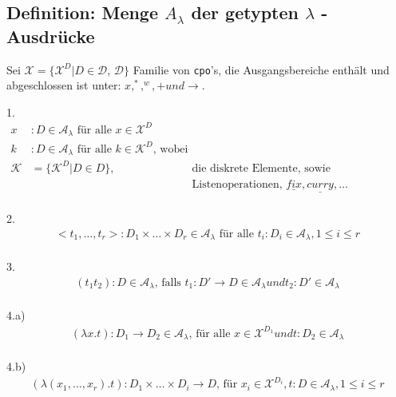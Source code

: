 \subsection{Definition: Menge $A_{\lambda}$ der getypten $\lambda$ -Ausdrücke}
Sei $\mathcal{X} = \{ \mathcal{X}^D | D \in \mathcal{D}$, $\mathcal{D} \}$ Familie von \lstinline!cpo!'s, die Ausgangsbereiche enthält und abgeschlossen ist unter: $x, ^* , ^w , + und \rightarrow$.
\begin{compactitem}
\item[1.] \begin{align*}
x &: D \in \mathcal{A}_\lambda \text{ für alle } x \in \mathcal{X}^D \tag{Atome, Variable}\\
k &: D \in \mathcal{A}_\lambda \text{ für alle } k \in \mathcal{K}^D \text{, wobei } \\ 
\mathcal{K} &= \{ \mathcal{K}^D | D \in D \}, &\text{die diskrete Elemente, sowie Projektionsfunktion,} \\
&& \text{Listenoperationen, } \underline{fix}, \underline{curry}, \dots \\
\end{align*}
\item[2.] \begin{align*}
<t_1, \dots , t_r> : D_1 \times \dots \times D_r \in \mathcal{A}_\lambda \text{ für alle } t_i : D_i \in \mathcal{A}_\lambda, 1 \leq i \leq r \tag{Tupel}\\
\end{align*}
\item[3.] \begin{align*}
(t_1 t_2) : D \in \mathcal{A}_\lambda \text{, falls } t_1 : D' \rightarrow D \in \mathcal{A}_\lambda und t_2 : D' \in \mathcal{A}_\lambda \tag{Applilation} \\
\end{align*}
\item[4.a)] \begin{align*}
(\lambda x.t) : D_1 \rightarrow D_2 \in \mathcal{A}_\lambda \text{, für alle } x \in \mathcal{X}^{D_1} und t:D_2 \in \mathcal{A}_\lambda  \tag{monadisch}\\
\end{align*}
\item[4.b)] \begin{align*}
(\lambda (x_1, \dots , x_r).t) : D_1 \times \dots \times D_i \rightarrow D \text{, für } x_i \in \mathcal{X}^{D_i}, t:D \in \mathcal{A}_\lambda, 1 \leq  i \leq r\tag{polyadisch}\\
\end{align*}
\end{compactitem}
